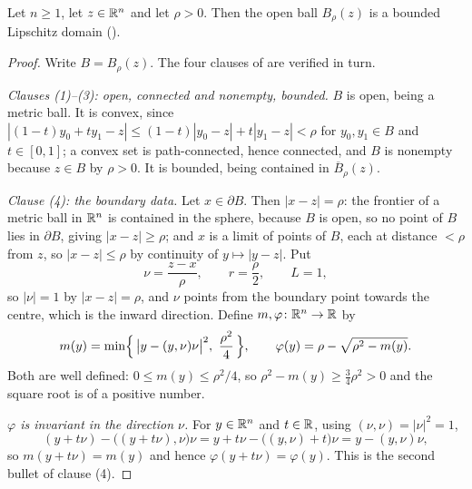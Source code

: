\begin{lemma}
Let $n\ge1$, let $z\in\mathbb{R}^n$ and let $\rho>0$.  Then the open ball $B_\rho(z)$
is a bounded Lipschitz domain ().
\end{lemma}
\begin{proof}
Write $B=B_\rho(z)$.  The four clauses of
 are verified in turn.

\medskip
\noindent\emph{Clauses \textup{(1)}--\textup{(3)}: open, connected and nonempty,
bounded.}  $B$ is open, being a metric ball.  It is convex, since
$|{(1-t)y_0+ty_1-z}|\le(1-t)|y_0-z|+t|y_1-z|<\rho$ for $y_0,y_1\in B$ and
$t\in[0,1]$; a convex set is path-connected, hence connected, and $B$ is
nonempty because $z\in B$ by $\rho>0$.  It is bounded, being contained in
$\overline B_\rho(z)$.

\medskip
\noindent\emph{Clause \textup{(4)}: the boundary data.}  Let
$x\in\partial B$.  Then $|x-z|=\rho$: the frontier of a metric ball in $\mathbb{R}^n$ is
contained in the sphere, because $B$ is open, so no point of $B$ lies in
$\partial B$, giving $|x-z|\ge\rho$; and $x$ is a limit of points of $B$, each at
distance $<\rho$ from $z$, so $|x-z|\le\rho$ by continuity of
$y\mapsto|y-z|$.  Put
\[
\nu=\frac{z-x}{\rho},
\qquad
r=\frac\rho2,
\qquad
L=1 ,
\]
so $|\nu|=1$ by $|x-z|=\rho$, and $\nu$ points from the boundary point towards
the centre, which is the inward direction.  Define $m,\varphi\colon\mathbb{R}^n\to\mathbb{R}$ by
\[
m(y)=\min\Bigl\{\,\bigl|y-(y,\nu)\nu\bigr|^2,\ \frac{\rho^2}4\,\Bigr\},
\qquad
\varphi(y)=\rho-\sqrt{\rho^2-m(y)} .
\]
Both are well defined: $0\le m(y)\le\rho^2/4$, so
$\rho^2-m(y)\ge\tfrac34\rho^2>0$ and the square root is of a positive number.

\emph{$\varphi$ is invariant in the direction $\nu$.}  For $y\in\mathbb{R}^n$ and
$t\in\mathbb{R}$, using $(\nu,\nu)=|\nu|^2=1$,
\[
(y+t\nu)-\bigl((y+t\nu),\nu\bigr)\nu
=y+t\nu-\bigl((y,\nu)+t\bigr)\nu
=y-(y,\nu)\nu ,
\]
so $m(y+t\nu)=m(y)$ and hence $\varphi(y+t\nu)=\varphi(y)$.  This is the second
bullet of clause (4).


\end{proof}
